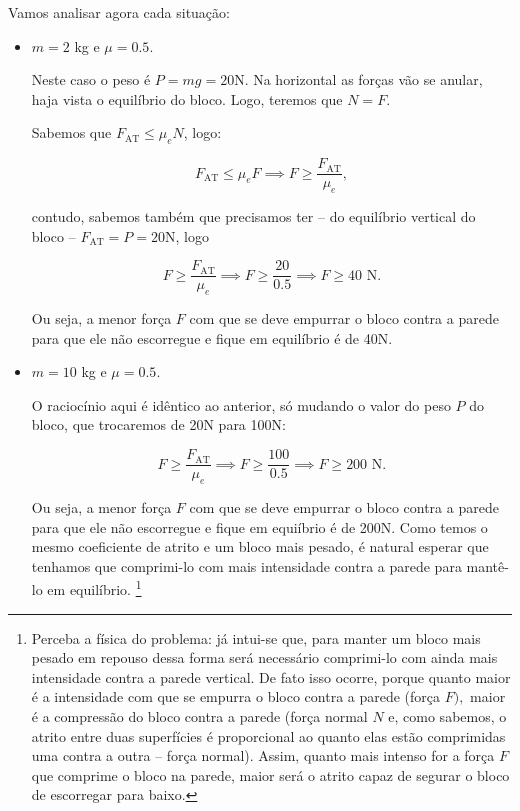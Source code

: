 \begin{exemplo}[Nível I]
Vamos analisar agora cada situação:


\begin{itemize}
    \item [a)] $m=2$ kg e $\mu = 0.5.$

    Neste caso o peso é $P=mg = 20$N. Na horizontal as forças vão se anular, haja vista o equilíbrio do bloco. Logo, teremos que $N=F.$

    Sabemos que $F_{\text{AT}} \leq \mu_e N$, logo:


    $$ F_{\text{AT}} \leq \mu_e F \implies F \geq \dfrac{F_{\text{AT}}}{\mu_e},  $$


   \noindent contudo, sabemos também que precisamos ter -- do equilíbrio vertical do bloco -- $F_\text{AT}=P=20$N, logo

   $$  F \geq \dfrac{F_{\text{AT}}}{\mu_e} \implies F \geq \dfrac{20}{0.5} \implies \boxed{F \geq 40 \text{ N.}} $$

   Ou seja, a menor força $F$ com que se deve empurrar o bloco contra a parede para que ele não escorregue e fique em equilíbrio é de 40N.
    
    \item [b)] $m=10$ kg e $\mu=0.5.$


    O raciocínio aqui é idêntico ao anterior, só mudando o valor do peso $P$ do bloco, que trocaremos de 20N para 100N:

    $$  F \geq \dfrac{F_{\text{AT}}}{\mu_e} \implies F \geq \dfrac{100}{0.5} \implies \boxed{F \geq 200 \text{ N.}} $$

    Ou seja, a menor força $F$ com que se deve empurrar o bloco contra a parede para que ele não escorregue e fique em equiíbrio é de 200N. Como temos o mesmo coeficiente de atrito e um bloco mais pesado, é natural esperar que tenhamos que comprimi-lo com mais intensidade contra a parede para mantê-lo em equilíbrio. \footnote{Perceba a física do problema: já intui-se que, para manter um bloco mais pesado em repouso dessa forma será necessário comprimi-lo com ainda mais intensidade contra a parede vertical. De fato isso ocorre, porque quanto maior é a intensidade com que se empurra o bloco contra a parede (força $F),$ maior é a compressão do bloco contra a parede (força normal $N$ e, como sabemos, o atrito entre duas superfícies é proporcional ao quanto elas estão comprimidas uma contra a outra -- força normal). Assim, quanto mais intenso for a força $F$ que comprime o bloco na parede, maior será o atrito capaz de segurar o bloco de escorregar para baixo.}
    

\end{itemize}
\end{exemplo}
